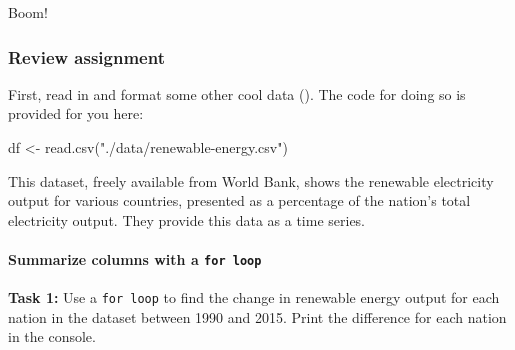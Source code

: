 \documentclass[
]{book}
\newenvironment{Shaded}{\begin{snugshade}}{\end{snugshade}}
\newcommand{\FunctionTok}[1]{\textcolor[rgb]{0.00,0.00,0.00}{#1}}
\newcommand{\NormalTok}[1]{#1}
\newcommand{\OtherTok}[1]{\textcolor[rgb]{0.56,0.35,0.01}{#1}}
\newcommand{\StringTok}[1]{\textcolor[rgb]{0.31,0.60,0.02}{#1}}
\begin{document}
Boom!

\hypertarget{review-assignment-8}{%
\subsubsection*{Review assignment}\label{review-assignment-8}}

First, read in and format some other cool data (). The code for doing so is provided for you here:

\begin{Shaded}
\begin{Highlighting}[]
\NormalTok{df }\OtherTok{\textless{}{-}} \FunctionTok{read.csv}\NormalTok{(}\StringTok{"./data/renewable{-}energy.csv"}\NormalTok{)}
\end{Highlighting}
\end{Shaded}

This dataset, freely available from World Bank, shows the renewable electricity output for various countries, presented as a percentage of the nation's total electricity output. They provide this data as a time series.

\hypertarget{summarize-columns-with-a-for-loop}{%
\paragraph*{\texorpdfstring{Summarize columns with a \texttt{for\ loop}}{Summarize columns with a for loop}}\label{summarize-columns-with-a-for-loop}}

\textbf{Task 1:} Use a \texttt{for\ loop} to find the change in renewable energy output for each nation in the dataset between 1990 and 2015. Print the difference for each nation in the console.
\end{document}
